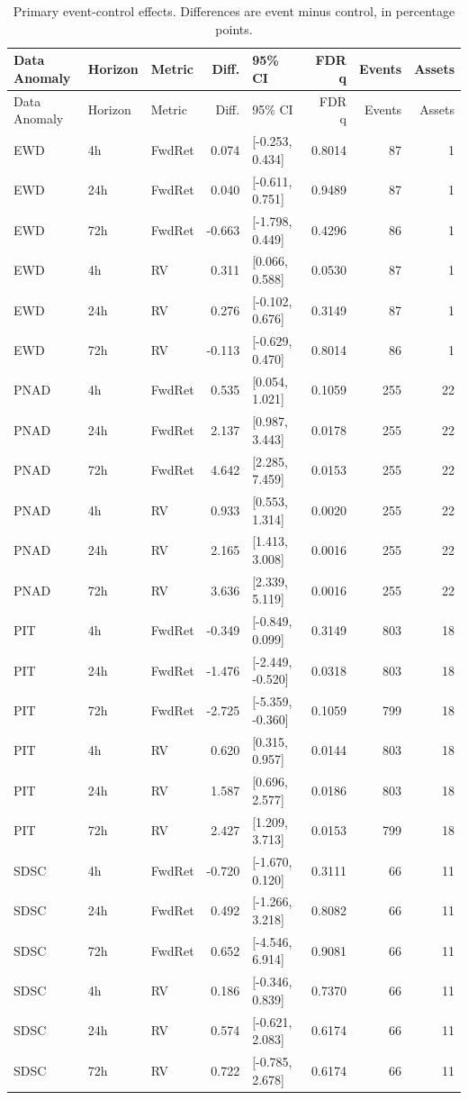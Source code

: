 \documentclass[11pt]{article}
\begin{document}
\begin{longtable}{lllrp{2.8cm}rrr}
\caption{Primary event-control effects. Differences are event minus control, in percentage points.}\\
\toprule
Data Anomaly & Horizon & Metric & Diff. & 95\% CI & FDR q & Events & Assets \\
\midrule
\endfirsthead
\toprule
Data Anomaly & Horizon & Metric & Diff. & 95\% CI & FDR q & Events & Assets \\
\midrule
\endhead
EWD & 4h & FwdRet & 0.074 & [-0.253, 0.434] & 0.8014 & 87 & 1 \\
EWD & 24h & FwdRet & 0.040 & [-0.611, 0.751] & 0.9489 & 87 & 1 \\
EWD & 72h & FwdRet & -0.663 & [-1.798, 0.449] & 0.4296 & 86 & 1 \\
EWD & 4h & RV & 0.311 & [0.066, 0.588] & 0.0530 & 87 & 1 \\
EWD & 24h & RV & 0.276 & [-0.102, 0.676] & 0.3149 & 87 & 1 \\
EWD & 72h & RV & -0.113 & [-0.629, 0.470] & 0.8014 & 86 & 1 \\
PNAD & 4h & FwdRet & 0.535 & [0.054, 1.021] & 0.1059 & 255 & 22 \\
PNAD & 24h & FwdRet & 2.137 & [0.987, 3.443] & 0.0178 & 255 & 22 \\
PNAD & 72h & FwdRet & 4.642 & [2.285, 7.459] & 0.0153 & 255 & 22 \\
PNAD & 4h & RV & 0.933 & [0.553, 1.314] & 0.0020 & 255 & 22 \\
PNAD & 24h & RV & 2.165 & [1.413, 3.008] & 0.0016 & 255 & 22 \\
PNAD & 72h & RV & 3.636 & [2.339, 5.119] & 0.0016 & 255 & 22 \\
PIT & 4h & FwdRet & -0.349 & [-0.849, 0.099] & 0.3149 & 803 & 18 \\
PIT & 24h & FwdRet & -1.476 & [-2.449, -0.520] & 0.0318 & 803 & 18 \\
PIT & 72h & FwdRet & -2.725 & [-5.359, -0.360] & 0.1059 & 799 & 18 \\
PIT & 4h & RV & 0.620 & [0.315, 0.957] & 0.0144 & 803 & 18 \\
PIT & 24h & RV & 1.587 & [0.696, 2.577] & 0.0186 & 803 & 18 \\
PIT & 72h & RV & 2.427 & [1.209, 3.713] & 0.0153 & 799 & 18 \\
SDSC & 4h & FwdRet & -0.720 & [-1.670, 0.120] & 0.3111 & 66 & 11 \\
SDSC & 24h & FwdRet & 0.492 & [-1.266, 3.218] & 0.8082 & 66 & 11 \\
SDSC & 72h & FwdRet & 0.652 & [-4.546, 6.914] & 0.9081 & 66 & 11 \\
SDSC & 4h & RV & 0.186 & [-0.346, 0.839] & 0.7370 & 66 & 11 \\
SDSC & 24h & RV & 0.574 & [-0.621, 2.083] & 0.6174 & 66 & 11 \\
SDSC & 72h & RV & 0.722 & [-0.785, 2.678] & 0.6174 & 66 & 11 \\
\bottomrule
\end{longtable}
\end{document}
